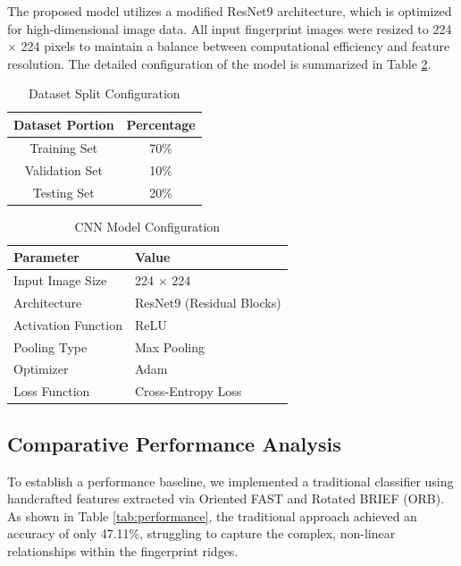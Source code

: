 \documentclass[conference]{IEEEtran}
\begin{document}
The proposed model utilizes a modified ResNet9 architecture, which is optimized for high-dimensional image data. All input fingerprint images were resized to 224 $\times$ 224 pixels to maintain a balance between computational efficiency and feature resolution. The detailed configuration of the model is summarized in Table \ref{tab:model_config}.

\begin{table}[htbp]
\centering
\caption{Dataset Split Configuration}
\label{tab:dataset_split}
\renewcommand{\arraystretch}{1.2}
\setlength{\tabcolsep}{6pt}
\begin{tabular}{|c|c|}
\hline
\textbf{Dataset Portion} & \textbf{Percentage} \\
\hline
Training Set & 70\% \\
Validation Set & 10\% \\
Testing Set & 20\% \\
\hline
\end{tabular}
\end{table}

\begin{table}[htbp]
\centering
\caption{CNN Model Configuration}
\label{tab:model_config}
\renewcommand{\arraystretch}{1.2}
\setlength{\tabcolsep}{6pt}
\begin{tabular}{|l|l|}
\hline
\textbf{Parameter} & \textbf{Value} \\
\hline
Input Image Size & 224 $\times$ 224 \\
Architecture & ResNet9 (Residual Blocks) \\
Activation Function & ReLU \\
Pooling Type & Max Pooling \\
Optimizer & Adam \\
Loss Function & Cross-Entropy Loss \\
\hline
\end{tabular}
\end{table}

\subsection{Comparative Performance Analysis}
To establish a performance baseline, we implemented a traditional classifier using handcrafted features extracted via Oriented FAST and Rotated BRIEF (ORB). As shown in Table \ref{tab:performance}, the traditional approach achieved an accuracy of only 47.11\%, struggling to capture the complex, non-linear relationships within the fingerprint ridges.
\end{document}
